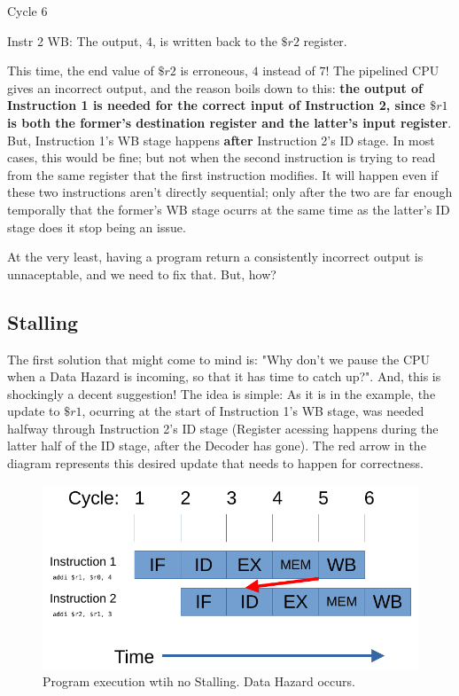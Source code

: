 \documentclass[12pt,twoside]{reedthesis}
\begin{document}
Cycle 6

\qquad Instr 2 WB: The output, $4$, is written back to the $\$r2$ register.

\vspace{5mm}

This time, the end value of $\$r2$ is erroneous, $4$ instead of $7$! The pipelined CPU gives an incorrect output, and the reason boils down to this: \textbf{the output of Instruction 1 is needed for the correct input of Instruction 2, since $\$r1$ is both the former's destination register and the latter's input register}. But, Instruction 1's WB stage happens \textbf{after} Instruction 2's ID stage. In most cases, this would be fine; but not when the second instruction is trying to read from the same register that the first instruction modifies. It will happen even if these two instructions aren't directly sequential; only after the two are far enough temporally that the former's WB stage ocurrs at the same time as the latter's ID stage does it stop being an issue.

At the very least, having a program return a consistently incorrect output is unnaceptable, and we need to fix that. But, how?

\subsection{Stalling}

The first solution that might come to mind is: "Why don't we pause the CPU when a Data Hazard is incoming, so that it has time to catch up?". And, this is shockingly a decent suggestion! The idea is simple: As it is in the example, the update to $\$r1$, ocurring at the start of Instruction 1's WB stage, was needed halfway through Instruction 2's ID stage (Register acessing happens during the latter half of the ID stage, after the Decoder has gone). The red arrow in the diagram represents this desired update that needs to happen for correctness.

\begin{figure}[h!]

	\centering
	\includegraphics[scale=0.9]{nostall}
	\caption{Program execution wtih no Stalling. Data Hazard occurs.}
	\label{no-stall}
\end{figure}
\end{document}
